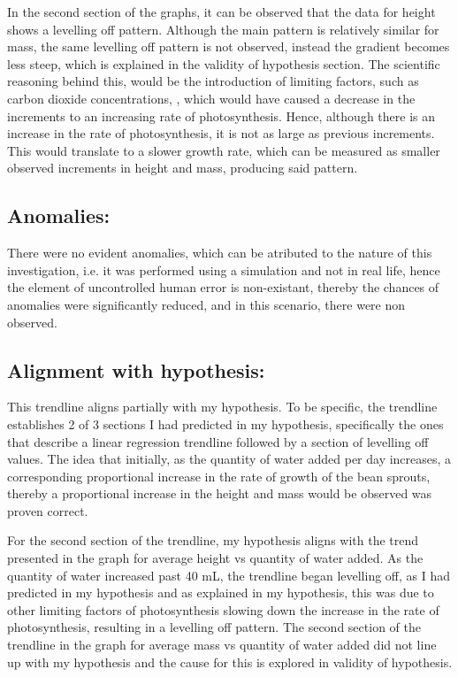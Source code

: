 \documentclass[11pt, a4]{article}
\begin{document}
			\bigbreak

			In the second section of the graphs, it can be observed that the data for height shows a levelling off pattern. Although the main pattern is relatively similar for mass, the same levelling off pattern is not observed, instead the gradient becomes less steep, which is explained in the validity of hypothesis section. The scientific reasoning behind this, would be the introduction of limiting factors, such as carbon dioxide concentrations, , which would have caused a decrease in the increments to an increasing rate of photosynthesis. Hence, although there is an increase in the rate of photosynthesis, it is not as large as previous increments. This would translate to a slower growth rate, which can be measured as smaller observed increments in height and mass, producing said pattern. 

		\subsection{Anomalies:}
			There were no evident anomalies, which can be atributed to the nature of this investigation, i.e. it was performed using a simulation and not in real life, hence the element of uncontrolled human error is non-existant, thereby the chances of anomalies were significantly reduced, and in this scenario, there were non observed.
		\subsection{Alignment with hypothesis:}
		This trendline aligns partially with my hypothesis. To be specific, the trendline establishes 2 of 3 sections I had predicted in my hypothesis, specifically the ones that describe a linear regression trendline followed by a section of levelling off values. The idea that initially, as the quantity of water added per day increases, a corresponding proportional increase in the rate of growth of the bean sprouts, thereby a proportional increase in the height and mass would be observed was proven correct.
				
			\bigbreak

		For the second section of the trendline, my hypothesis aligns with the trend presented in the graph for average height vs quantity of water added. As the quantity of water increased past 40 mL, the trendline began levelling off, as I had predicted in my hypothesis and as explained in my hypothesis, this was due to other limiting factors of photosynthesis slowing down the increase in the rate of photosynthesis, resulting in a levelling off pattern. The second section of the trendline in the graph for average mass vs quantity of water added did not line up with my hypothesis and the cause for this is explored in validity of hypothesis.
\end{document}
